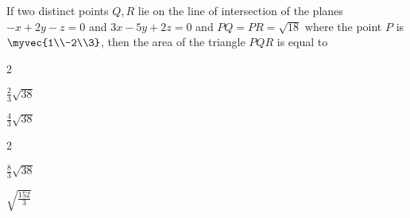 	\item If two distinct points $Q,R$ lie on the line of intersection of the planes $-x+2y-z=0$ and $3x-5y+2z=0$ and $PQ=PR=\sqrt{18}$ where the point $P$ is $\myvec{1\\-2\\3}$, then the area of the triangle $PQR$ is equal to
		\begin{enumerate}
			\end{enumerate}

